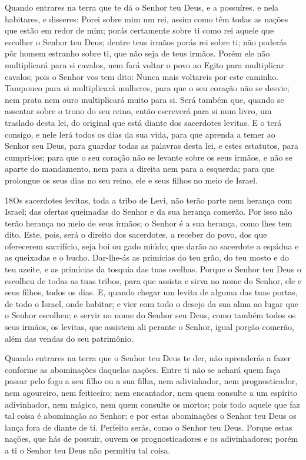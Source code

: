Quando entrares na terra que te dá o Senhor teu Deus, e a
possuíres, e nela habitares, e disseres: Porei sobre mim um rei,
assim como têm todas as nações que estão em redor de mim;
porás certamente sobre ti como rei aquele que escolher o
Senhor teu Deus; dentre teus irmãos porás rei sobre ti; não poderás
pôr homem estranho sobre ti, que não seja de teus irmãos.
Porém ele não multiplicará para si cavalos, nem fará voltar o
povo ao Egito para multiplicar cavalos; pois o Senhor vos tem dito:
Nunca mais voltareis por este caminho. Tampouco para si
multiplicará mulheres, para que o seu coração não se desvie; nem
prata nem ouro multiplicará muito para si. Será também que,
quando se assentar sobre o trono do seu reino, então escreverá para
si num livro, um traslado desta lei, do original que está diante dos
sacerdotes levitas. E o terá consigo, e nele lerá todos os
dias da sua vida, para que aprenda a temer ao Senhor seu Deus, para
guardar todas as palavras desta lei, e estes estatutos, para
cumpri-los; para que o seu coração não se levante sobre os
seus irmãos, e não se aparte do mandamento, nem para a direita nem
para a esquerda; para que prolongue os seus dias no seu reino, ele e
seus filhos no meio de Israel.

\medskip

\lettrine{18} Os sacerdotes levitas, toda a tribo de Levi, não
terão parte nem herança com Israel; das ofertas queimadas do Senhor
e da sua herança comerão. Por isso não terão herança no meio de
seus irmãos; o Senhor é a sua herança, como lhes tem dito. Este,
pois, será o direito dos sacerdotes, a receber do povo, dos que
oferecerem sacrifício, seja boi ou gado miúdo; que darão ao
sacerdote a espádua e as queixadas e o bucho. Dar-lhe-ás as
primícias do teu grão, do teu mosto e do teu azeite, e as primícias
da tosquia das tuas ovelhas. Porque o Senhor teu Deus o escolheu
de todas as tuas tribos, para que assista e sirva no nome do Senhor,
ele e seus filhos, todos os dias. E, quando chegar um levita de
alguma das tuas portas, de todo o Israel, onde habitar; e vier com
todo o desejo da sua alma ao lugar que o Senhor escolheu; e
servir no nome do Senhor seu Deus, como também todos os seus irmãos,
os levitas, que assistem ali perante o Senhor, igual porção
comerão, além das vendas do seu patrimônio.

Quando entrares na terra que o Senhor teu Deus te der, não
aprenderás a fazer conforme as abominações daquelas nações.
Entre ti não se achará quem faça passar pelo fogo a seu filho
ou a sua filha, nem adivinhador, nem prognosticador, nem agoureiro,
nem feiticeiro; nem encantador, nem quem consulte a um
espírito adivinhador, nem mágico, nem quem consulte os mortos;
pois todo aquele que faz tal coisa é abominação ao Senhor; e
por estas abominações o Senhor teu Deus os lança fora de diante de
ti. Perfeito serás, como o Senhor teu Deus. Porque
estas nações, que hás de possuir, ouvem os prognosticadores e os
adivinhadores; porém a ti o Senhor teu Deus não permitiu tal coisa.

